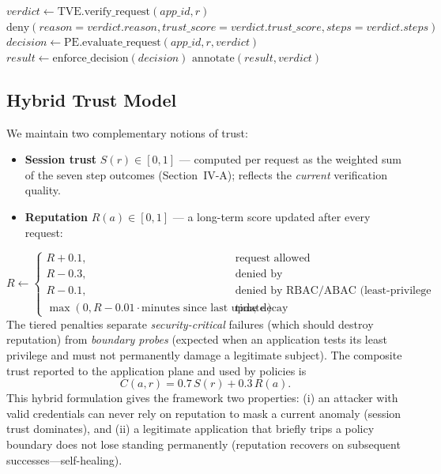 \documentclass[journal]{IEEEtran}
\begin{document}
\begin{algorithm}[t]
\caption{Fail-closed enforcement}
\label{alg:pep}
\begin{algorithmic}[1]
  \State $\mathit{verdict} \gets \text{TVE.verify\_request}(\mathit{app\_id}, r)$ 
    \State \Return $\text{deny}(\mathit{reason}{=}\mathit{verdict.reason}, \mathit{trust\_score}{=}\mathit{verdict.trust\_score}, \mathit{steps}{=}\mathit{verdict.steps})$
  \EndIf
  \State $\mathit{decision} \gets \text{PE.evaluate\_request}(\mathit{app\_id}, r, \mathit{verdict})$
  \State $\mathit{result} \gets \text{enforce\_decision}(\mathit{decision})$ 
  \State \Return $\text{annotate}(\mathit{result}, \mathit{verdict})$ 
\EndFunction
\end{algorithmic}
\end{algorithm}

\subsection{Hybrid Trust Model}
We maintain two complementary notions of trust:
\begin{itemize}
\item \textbf{Session trust} $S(r)\in[0,1]$ --- computed per request as the weighted sum of the seven step outcomes (Section~IV-A); reflects the \emph{current} verification quality.
\item \textbf{Reputation} $R(a)\in[0,1]$ --- a long-term score updated after every request:
\end{itemize}
\begin{equation}
R \leftarrow \begin{cases}
R + 0.1, & \text{request allowed}\\
R - 0.3, & \text{denied by authentication/identity/behavioral layers}\\
R - 0.1, & \text{denied by RBAC/ABAC (least-privilege violation)}\\
\max(0, R - 0.01\cdot \text{minutes since last update}), & \text{time decay}
\end{cases}
\end{equation}
The tiered penalties separate \emph{security-critical} failures (which should destroy reputation) from \emph{boundary probes} (expected when an application tests its least privilege and must not permanently damage a legitimate subject). The composite trust reported to the application plane and used by policies is
\begin{equation}
C(a,r) = 0.7\,S(r) + 0.3\,R(a).
\end{equation}
This hybrid formulation gives the framework two properties: (i) an attacker with valid credentials can never rely on reputation to mask a current anomaly (session trust dominates), and (ii) a legitimate application that briefly trips a policy boundary does not lose standing permanently (reputation recovers on subsequent successes---self-healing).
\end{document}
